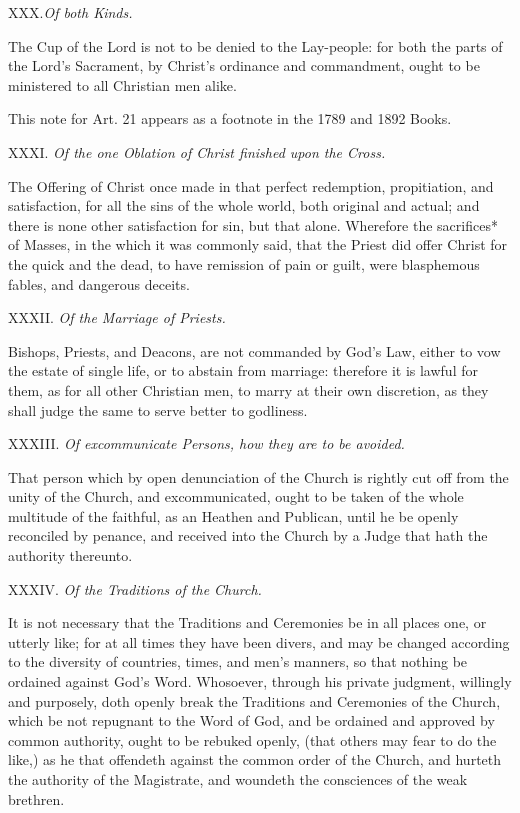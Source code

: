 XXX.\emph{Of both Kinds.}

The
Cup of the Lord is not to be denied to the Lay-people: for both the parts
of the Lord’s Sacrament, by Christ’s ordinance and commandment,
ought to be ministered to all Christian men alike.

This
note for Art. 21 appears as a footnote in the 1789 and 1892 Books.

XXXI. \emph{Of the one Oblation of Christ finished upon
the Cross.}

The Offering of Christ once made in that perfect redemption,
propitiation, and satisfaction, for all the sins of the whole world, both
original and actual; and there is none other satisfaction for sin, but
that alone. Wherefore the sacrifices* of Masses, in the which it was commonly
said, that the Priest did offer Christ for the quick and the dead, to
have remission of pain or guilt, were blasphemous fables, and dangerous
deceits.

XXXII. \emph{Of the Marriage of Priests.}

Bishops, Priests, and Deacons, are not commanded by God’s
Law, either to vow the estate of single life, or to abstain from marriage:
therefore it is lawful for them, as for all other Christian men, to marry
at their own discretion, as they shall judge the same to serve better
to godliness.

XXXIII. \emph{Of excommunicate Persons, how they are to
be avoided.}

That person which by open denunciation of the Church
is rightly cut off from the unity of the Church, and excommunicated, ought
to be taken of the whole multitude of the faithful, as an Heathen and
Publican, until he be openly reconciled by penance, and received into
the Church by a Judge that hath the authority thereunto.

XXXIV. \emph{Of the Traditions of the Church.}

It is not necessary that the Traditions and Ceremonies
be in all places one, or utterly like; for at all times they have been
divers, and may be changed according to the diversity of countries, times,
and men’s manners, so that nothing be ordained against God’s
Word. Whosoever, through his private judgment, willingly and purposely,
doth openly break the Traditions and Ceremonies of the Church, which be
not repugnant to the Word of God, and be ordained and approved by common
authority, ought to be rebuked openly, (that others may fear to do the
like,) as he that offendeth against the common order of the Church, and
hurteth the authority of the Magistrate, and woundeth the consciences
of the weak brethren.

